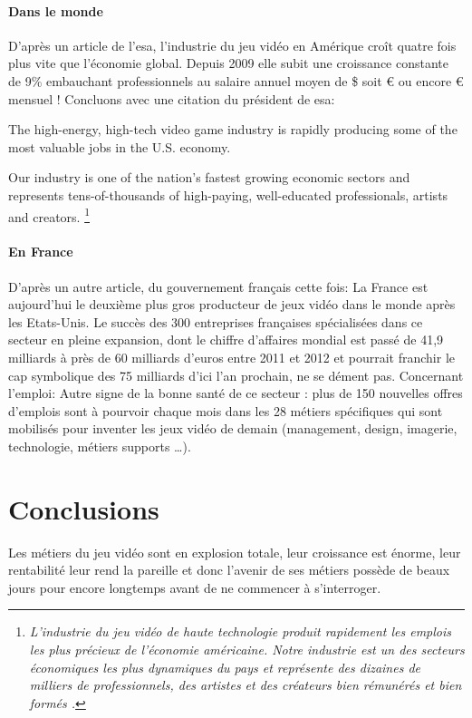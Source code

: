 \documentclass[12pt, a4paper]{report} %
\begin{document}
\paragraph{Dans le monde } 
D'après un article de l'\acrshort{esa}\cite{artesa}, l'industrie du jeu vidéo en Amérique croît quatre fois plus vite que l'économie global. Depuis 2009 elle subit une croissance constante de 9\%{} embauchant  professionnels au salaire annuel moyen de \${} soit \euro{} ou encore \euro{} mensuel ! Concluons avec une citation du président de \acrshort{esa}:
{
The high-energy, high-tech video game industry is rapidly producing some of the most valuable jobs in the U.S. economy.

Our industry is one of the nation's fastest growing economic sectors and represents tens-of-thousands of high-paying, well-educated professionals, artists and creators. \footnote
{ 
\emph{
L'industrie du jeu vidéo de haute technologie produit rapidement les emplois les plus précieux de l'économie américaine.  Notre industrie est un des secteurs économiques les plus dynamiques du pays et représente des dizaines de milliers de professionnels, des artistes et des créateurs bien rémunérés et bien formés .}
}
}


\paragraph{En France} 
D'après un autre article\cite{artministre}, du gouvernement français cette fois:
{
La France est aujourd'hui le deuxième plus gros producteur de jeux vidéo dans le monde après les Etats-Unis. Le succès des 300 entreprises françaises spécialisées dans ce secteur en pleine expansion, dont le chiffre d'affaires mondial est passé de 41,9 milliards à près de 60 milliards d'euros entre 2011 et 2012 et pourrait franchir le cap symbolique des 75 milliards d'ici l'an prochain, ne se dément pas.
}
Concernant l'emploi:
{
Autre signe de la bonne santé de ce secteur : plus de 150 nouvelles offres d'emplois sont à pourvoir chaque mois dans les 28 métiers spécifiques qui sont mobilisés pour inventer les jeux vidéo de demain (management, design, imagerie, technologie, métiers supports \dots{}). 
}

\section*{Conclusions}
Les métiers du jeu vidéo sont en explosion totale, leur croissance est énorme, leur rentabilité leur rend la pareille et donc l'avenir de ses métiers possède de beaux jours pour encore longtemps avant de ne commencer à s'interroger.
\end{document}
